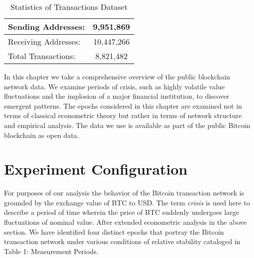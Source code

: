 \begin{table}
\centering
\caption{Statistics of Transactions Dataset}
\label{my-label}
\begin{tabular}{|l|c|}
\hline
Sending Addresses:   & 9,951,869  \\ \hline
Receiving Addresses: & 10,447,266 \\ \hline
Total Transactions:  & 8,821,482  \\ \hline
\end{tabular}
\end{table}

In this chapter we take a comprehensive overview of the public blockchain network data.
We examine periods of crisis, such as highly volatile value fluctuations and the implosion of a major financial institution, to discover emergent patterns.  
The epochs considered in this chapter are examined not in terms of classical econometric theory but rather in terms of network structure and empirical analysis. 
The data we use is available as part of the public Bitcoin blockchain as open data.



\section{Experiment Configuration}

For purposes of our analysis the behavior of the Bitcoin transaction network is grounded by the exchange value of BTC to USD. 
The term \textit{crisis} is used here to describe a period of time wherein the price of BTC suddenly undergoes large fluctuations of nominal value. 
After extended econometric analysis in the above section. We have identified four distinct epochs that portray the Bitcoin transaction network under various conditions of relative stability cataloged in Table 1: Measurement Periods. 

